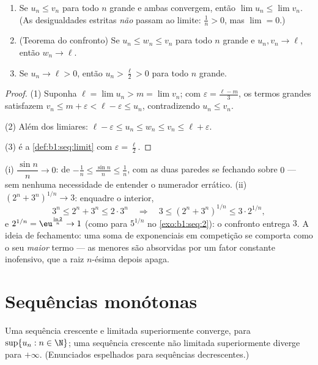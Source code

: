 \begin{theorem}\label{thm:b1:seq:order}
\begin{enumerate}
  \item Se $u_n \leq v_n$ para todo $n$ grande e ambas convergem, então
        $\lim u_n \leq \lim v_n$. (As desigualdades estritas \emph{não}
        passam ao limite: $\frac 1n > 0$, mas $\lim = 0$.)
  \item (Teorema do confronto) Se $u_n \leq w_n
        \leq v_n$ para todo $n$ grande e $u_n, v_n \to \ell$, então
        $w_n \to \ell$.
  \item Se $u_n \to \ell > 0$, então $u_n > \frac\ell2 > 0$ para todo
        $n$ grande.
\end{enumerate}
\end{theorem}

\begin{proof}
(1) Suponha $\ell = \lim u_n > m = \lim v_n$; com $\varepsilon =
\frac{\ell - m}{3}$, os termos grandes satisfazem $v_n \leq m + \varepsilon <
\ell - \varepsilon \leq u_n$, contradizendo $u_n \leq v_n$.

(2) Além dos limiares: $\ell - \varepsilon \leq u_n \leq w_n \leq
v_n \leq \ell + \varepsilon$.

(3) é a \cref{def:b1:seq:limit} com $\varepsilon = \frac\ell2$.
\end{proof}

\begin{example}\label{ex:b1:seq:squeezes}
(i) $\dfrac{\sin n}{n} \to 0$: de $-\frac1n \leq \frac{\sin
n}{n} \leq \frac1n$, com as duas paredes se fechando sobre $0$ --- sem
nenhuma necessidade de entender o numerador errático. (ii) $(2^n +
3^n)^{1/n} \to 3$: enquadre o interior,
\[
3^n \leq 2^n + 3^n \leq 2\cdot3^n
\quad\Longrightarrow\quad
3 \leq (2^n + 3^n)^{1/n} \leq 3\cdot 2^{1/n} ,
\]
e $2^{1/n} = \eu^{\frac{\ln 2}{n}} \to 1$ (como para $5^{1/n}$ no
\cref{exo:b1:seq:2}): o confronto entrega $3$. A ideia de
fechamento: uma soma de exponenciais em competição se comporta como o
seu \emph{maior} termo --- as menores são absorvidas por um fator
constante inofensivo, que a raiz $n$-ésima depois apaga.
\end{example}

\section{Sequências monótonas}

\begin{theorem}\label{thm:b1:seq:monotone}
Uma sequência crescente e limitada superiormente converge, para
$\sup\{u_n : n \in
\N\}$; uma sequência crescente não limitada superiormente diverge
para $+\infty$. (Enunciados espelhados para sequências
decrescentes.)
\end{theorem}

